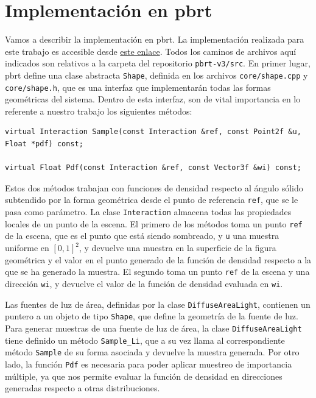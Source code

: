 \newpage
\lstset{style = Consola}

\section{Implementación en pbrt}

Vamos a describir la implementación en pbrt. La implementación realizada para este trabajo es accesible desde \href{https://github.com/emilio98/TFG}{este enlace}. Todos los caminos de archivos aquí indicados son relativos a la carpeta del repositorio \lstinline{pbrt-v3/src}. En primer lugar, pbrt define una clase abstracta \lstinline{Shape}, definida en los archivos \lstinline{core/shape.cpp} y \lstinline{core/shape.h}, que es una interfaz que implementarán todas las formas geométricas del sistema. Dentro de esta interfaz, son de vital importancia en lo referente a nuestro trabajo los siguientes métodos:
\begin{lstlisting}[caption = Métodos relevantes de la clase Shape, style = CodigoC++]
virtual Interaction Sample(const Interaction &ref, const Point2f &u, Float *pdf) const;

virtual Float Pdf(const Interaction &ref, const Vector3f &wi) const;
\end{lstlisting}

Estos dos métodos trabajan con funciones de densidad respecto al ángulo sólido subtendido por la forma geométrica desde el punto de referencia \lstinline{ref}, que se le pasa como parámetro. La clase \lstinline{Interaction} almacena todas las propiedades locales de un punto de la escena. El primero de los métodos toma un punto \lstinline{ref} de la escena, que es el punto que está siendo sombreado, y \lstinline{u} una muestra uniforme en $[0,1]^2$, y devuelve una muestra en la superficie de la figura geométrica y el valor en el punto generado de la función de densidad respecto a la que se ha generado la muestra. El segundo toma un punto \lstinline{ref} de la escena y una dirección \lstinline{wi}, y devuelve el valor de la función de densidad evaluada en \lstinline{wi}. 

Las fuentes de luz de área, definidas por la clase \lstinline{DiffuseAreaLight}, contienen un puntero a un objeto de tipo \lstinline{Shape}, que define la geometría de la fuente de luz. Para generar muestras de una fuente de luz de área, la clase \lstinline{DiffuseAreaLight} tiene definido un método \lstinline{Sample_Li}, que a su vez llama al correspondiente método \lstinline{Sample} de su forma asociada y devuelve la muestra generada. Por otro lado, la función \lstinline{Pdf} es necesaria para poder aplicar muestreo de importancia múltiple, ya que nos permite evaluar la función de densidad en direcciones generadas respecto a otras distribuciones.

